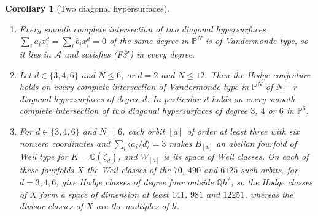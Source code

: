 \documentclass[11pt,reqno]{amsart}
\theoremstyle{plain}
\newtheorem{corollary}[theorem]{Corollary}
\theoremstyle{definition}
\theoremstyle{remark}
\newcommand{\QQ}{\mathbb{Q}}
\newcommand{\PP}{\mathbb{P}}
\begin{document}
\begin{corollary}[Two diagonal hypersurfaces]\label{cor:twodiagonal}
\leavevmode
\begin{enumerate}[label=\textup{(\roman*)},leftmargin=2.6em,itemsep=2pt]
\item Every smooth complete intersection of two diagonal hypersurfaces
  $\sum_{i}a_{i}x_{i}^{d}=\sum_{i}b_{i}x_{i}^{d}=0$ of the same degree in
  $\PP^{N}$ is of Vandermonde type, so it lies in $\mathcal{A}$ and
  satisfies \textup{(F3$'$)} in every degree.
\item Let $d\in\{3,4,6\}$ and $N\le6$, or $d=2$ and $N\le12$. Then the
  Hodge conjecture holds on every complete intersection of Vandermonde type
  in $\PP^{N}$ of $N-r$ diagonal hypersurfaces of degree $d$. In particular
  it holds on every smooth complete intersection of two diagonal
  hypersurfaces of degree $3$, $4$ or $6$ in $\PP^{6}$.
\item For $d\in\{3,4,6\}$ and $N=6$, each orbit $[a]$ of order at least
  three with six nonzero coordinates and $\sum_{i}\langle a_{i}/d\rangle=3$ makes $B_{[a]}$ an
  abelian fourfold of Weil type for $K=\QQ(\zeta_{d})$, and $W_{[a]}$ is its
  space of Weil classes. On each of these fourfolds $X$ the Weil classes of
  the $70$, $490$ and $6125$ such orbits, for $d=3,4,6$, give Hodge classes of
  degree four outside $\QQ h^{2}$, so the Hodge classes of $X$ form a space of
  dimension at least $141$, $981$ and $12251$, whereas the divisor classes of
  $X$ are the multiples of $h$.
\end{enumerate}
\end{corollary}
\end{document}
